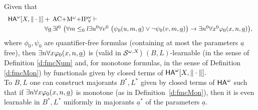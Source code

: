 \begin{thm}\label{t:bdLem}
Given that
\[ \ba{l} 
\ha[X,\|\cdot\|]+\, \mbox{\rm AC$+$M$^{\omega}+$IP}^{\omega}_{\forall} 
\vdash\\[1mm] \hspace*{2cm} \forall \underline{a}\,\exists l^0\ \big( 
\forall m\leq_0 l \exists u^0 \forall v^0\ 
\big(\psi_0(u,m,\tup a) \vee \neg\psi_0(v,m,\tup a)\big)\rightarrow \exists 
n^0 \forall x^0 \phi_0(x,n,\tup a)\big),\ea 
\]
where $\phi_0,\psi_0$ are quantifier-free formulas (containing at most the 
parameters $\underline{a}$ free), 
then $\exists n\forall x \varphi_0(x,n,\underline a)$ 
is (valid in ${\cal S}^{\omega,X}$) $(B,L)$-learnable (in the sense 
of Definition \ref{d:fmcNum} and, for monotone formulas, in the 
sense of Definition \ref{d:fmcMon}) by functionals given by 
closed terms of ${\textsf{\upshape HA}}^\omega[X,\|\cdot\|].$ \\
To $B,L$ one can construct majorants 
$B^*,L^*$ given by closed terms of ${\textsf{\upshape HA}}^\omega$ such that 
if $\exists n\forall x \varphi_0(x,n,\underline a)$ is monotone (as in 
Definition~\ref{d:fmcMon}), then it is even learnable in $B^*,L^*$ uniformly in majorants $\underline{a}^*$ of the parameters $\underline{a}.$
\end{thm}

